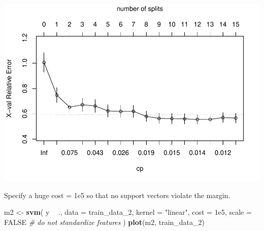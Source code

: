 \documentclass[]{book}
\newenvironment{Shaded}{\begin{snugshade}}{\end{snugshade}}
\newcommand{\CommentTok}[1]{\textcolor[rgb]{0.56,0.35,0.01}{\textit{#1}}}
\newcommand{\DataTypeTok}[1]{\textcolor[rgb]{0.13,0.29,0.53}{#1}}
\newcommand{\DecValTok}[1]{\textcolor[rgb]{0.00,0.00,0.81}{#1}}
\newcommand{\FloatTok}[1]{\textcolor[rgb]{0.00,0.00,0.81}{#1}}
\newcommand{\KeywordTok}[1]{\textcolor[rgb]{0.13,0.29,0.53}{\textbf{#1}}}
\newcommand{\NormalTok}[1]{#1}
\newcommand{\OperatorTok}[1]{\textcolor[rgb]{0.81,0.36,0.00}{\textbf{#1}}}
\newcommand{\OtherTok}[1]{\textcolor[rgb]{0.56,0.35,0.01}{#1}}
\newcommand{\StringTok}[1]{\textcolor[rgb]{0.31,0.60,0.02}{#1}}
\begin{document}
\begin{Shaded}
\end{Shaded}

\includegraphics{data-sci_files/figure-latex/unnamed-chunk-100-1.pdf}

Specify a huge cost = 1e5 so that no support vectors violate the margin.

\begin{Shaded}
\begin{Highlighting}[]
\NormalTok{m2 <-}\StringTok{ }\KeywordTok{svm}\NormalTok{(}
\NormalTok{  y }\OperatorTok{~}\StringTok{ }\NormalTok{., }
  \DataTypeTok{data =}\NormalTok{ train_data_}\DecValTok{2}\NormalTok{,}
  \DataTypeTok{kernel =} \StringTok{"linear"}\NormalTok{,}
  \DataTypeTok{cost =} \FloatTok{1e5}\NormalTok{,}
  \DataTypeTok{scale =} \OtherTok{FALSE}  \CommentTok{# do not standardize features}
\NormalTok{)}
\KeywordTok{plot}\NormalTok{(m2, train_data_}\DecValTok{2}\NormalTok{)}
\end{Highlighting}
\end{Shaded}
\end{document}
